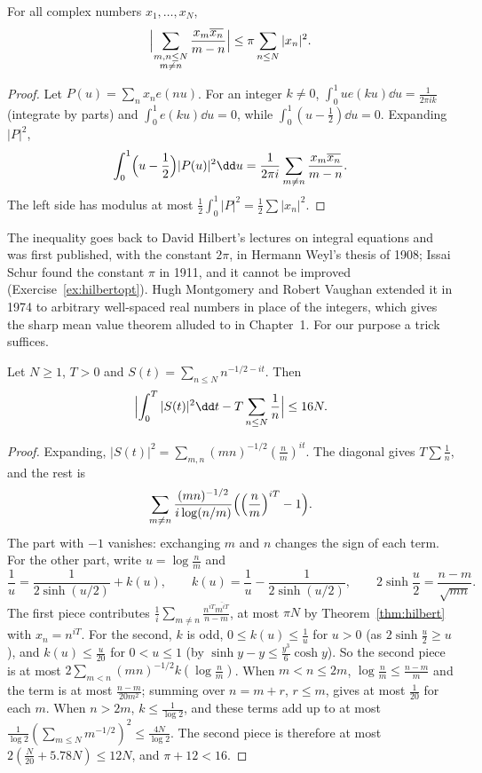 \begin{theorem}\label{thm:hilbert}
For all complex numbers $x_1,\dots,x_N$,
\[
\Bigl|\sum_{\substack{m,n\le N\\m\ne n}}\frac{x_m\overline{x_n}}{m-n}\Bigr|\le\pi\sum_{n\le N}|x_n|^2.
\]
\end{theorem}
\begin{proof}
Let $P(u)=\sum_nx_ne(nu)$. For an integer $k\ne0$, $\int_0^1ue(ku)\dd u=\frac1{2\pi ik}$ (integrate by parts) and $\int_0^1e(ku)\dd u=0$, while $\int_0^1(u-\frac12)\dd u=0$. Expanding $|P|^2$,
\[
\int_0^1\Bigl(u-\frac12\Bigr)|P(u)|^2\dd u=\frac1{2\pi i}\sum_{m\ne n}\frac{x_m\overline{x_n}}{m-n}.
\]
The left side has modulus at most $\frac12\int_0^1|P|^2=\frac12\sum|x_n|^2$.
\end{proof}

The inequality goes back to David Hilbert's lectures on integral equations and was first published, with the constant $2\pi$, in Hermann Weyl's thesis of 1908; Issai Schur found the constant $\pi$ in 1911, and it cannot be improved (Exercise~\ref{ex:hilbertopt}). Hugh Montgomery and Robert Vaughan extended it in 1974 to arbitrary well-spaced real numbers in place of the integers, which gives the sharp mean value theorem alluded to in Chapter~1. For our purpose a trick suffices.

\begin{proposition}\label{prop:meansqpoly}
Let $N\ge1$, $T>0$ and $S(t)=\sum_{n\le N}n^{-1/2-it}$. Then
\[
\Bigl|\int_0^T|S(t)|^2\dd t-T\sum_{n\le N}\frac1n\Bigr|\le16N.
\]
\end{proposition}
\begin{proof}
Expanding, $|S(t)|^2=\sum_{m,n}(mn)^{-1/2}(\frac nm)^{it}$. The diagonal gives $T\sum\frac1n$, and the rest is
\[
\sum_{m\ne n}\frac{(mn)^{-1/2}}{i\log(n/m)}\Bigl(\Bigl(\frac nm\Bigr)^{iT}-1\Bigr).
\]
The part with $-1$ vanishes: exchanging $m$ and $n$ changes the sign of each term. For the other part, write $u=\log\frac nm$ and
\[
\frac1u=\frac1{2\sinh(u/2)}+k(u),\qquad k(u)=\frac1u-\frac1{2\sinh(u/2)},\qquad2\sinh\frac u2=\frac{n-m}{\sqrt{mn}}.
\]
The first piece contributes $\frac1i\sum_{m\ne n}\frac{n^{iT}\overline{m^{iT}}}{n-m}$, at most $\pi N$ by Theorem~\ref{thm:hilbert} with $x_n=n^{iT}$. For the second, $k$ is odd, $0\le k(u)\le\frac1u$ for $u>0$ (as $2\sinh\frac u2\ge u$), and $k(u)\le\frac u{20}$ for $0<u\le1$ (by $\sinh y-y\le\frac{y^3}6\cosh y$). So the second piece is at most $2\sum_{m<n}(mn)^{-1/2}k(\log\frac nm)$. When $m<n\le2m$, $\log\frac nm\le\frac{n-m}m$ and the term is at most $\frac{n-m}{20m^2}$; summing over $n=m+r$, $r\le m$, gives at most $\frac1{20}$ for each $m$. When $n>2m$, $k\le\frac1{\log2}$, and these terms add up to at most $\frac1{\log2}(\sum_{m\le N}m^{-1/2})^2\le\frac{4N}{\log2}$. The second piece is therefore at most $2(\frac N{20}+5.78N)\le12N$, and $\pi+12<16$.
\end{proof}

